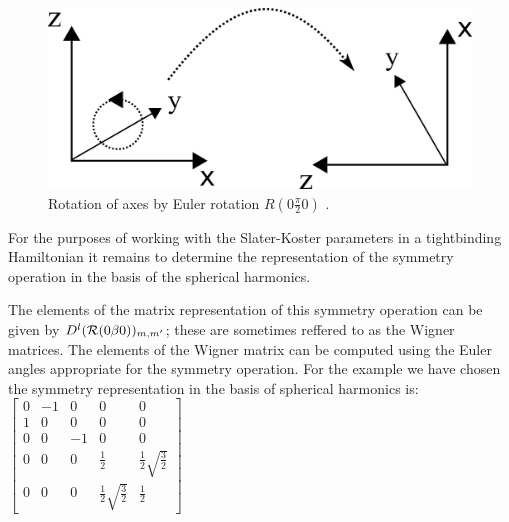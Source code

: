 \begin{figure}[!hbt]
\begin{center}
\includegraphics{./appen/rotateaxes.png}
\caption{Rotation of axes by Euler rotation $R(0\frac{\pi}{2}0)$ \label{fig:rotateaxes}.}
\end{center}
\end{figure}

For the purposes of working with the Slater-Koster parameters in 
a tightbinding Hamiltonian it remains to determine the representation of
the symmetry operation in the basis of the spherical harmonics.

The elements of the matrix representation of this symmetry operation 
can be given by $D^{l}({\mathcal{R}}(0\beta0))_{m,m'}$; these are sometimes reffered to as 
the Wigner matrices. The elements of the Wigner matrix can be computed using the Euler angles
appropriate for the symmetry operation. For the example we have chosen the symmetry representation
in the basis of spherical harmonics is:
%
$\left[\begin{array}{ccccc}
0  & -1 &  0 & 0 & 0 \\
1  &  0 &  0 & 0 & 0 \\
0  &  0 & -1 & 0 & 0 \\
0  &  0 &  0 & \frac{1}{2} & \frac{1}{2}\sqrt{\frac{3}{2}} \\
0  &  0 &  0 & \frac{1}{2}\sqrt{\frac{3}{2}} & \frac{1}{2}
\end{array}\right]$
%

